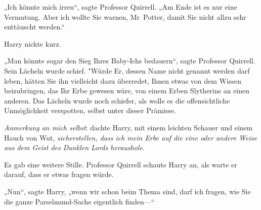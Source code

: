 „Ich könnte mich irren“, sagte Professor Quirrell. „Am Ende ist es nur eine Vermutung. Aber ich wollte Sie warnen, Mr~Potter, damit Sie nicht allzu sehr enttäuscht werden.“

Harry nickte kurz.

„Man könnte sogar den Sieg Ihres Baby-Ichs bedauern“, sagte Professor Quirrell. Sein Lächeln wurde schief. "Würde Er, dessen Name nicht genannt werden darf leben, hätten Sie ihn vielleicht dazu überredet, Ihnen etwas von dem Wissen beizubringen, das Ihr Erbe gewesen wäre, von einem Erben Slytherins an einen anderen. Das Lächeln wurde noch schiefer, als wolle es die offensichtliche Unmöglichkeit verspotten, selbst unter dieser Prämisse.

\emph{Anmerkung an mich selbst}: dachte Harry, mit einem leichten Schauer und einem Hauch von Wut, \emph{sicherstellen, dass ich mein Erbe auf die eine oder andere Weise aus dem Geist des Dunklen Lords heraushole}.

Es gab eine weitere Stille. Professor Quirrell schaute Harry an, als warte er darauf, dass er etwas fragen würde.

„Nun“, sagte Harry, „wenn wir schon beim Thema sind, darf ich fragen, wie Sie die ganze Parselmund-Sache eigentlich finden—“

